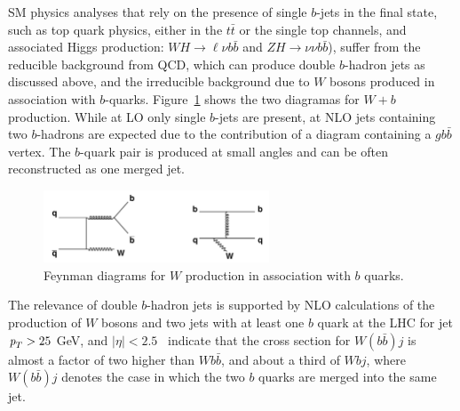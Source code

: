 SM physics analyses that rely on the presence of single $b$-jets in the final state, such as top quark physics, either in the $t\bar{t}$ or the single top channels, and associated Higgs production: $WH\rightarrow\ell\nu b\bar{b}$ and $ZH\rightarrow\nu\nu b\bar{b}$),  suffer from  %
the reducible background from QCD, which can produce double $b$-hadron jets as discussed above, and the irreducible background due to $W$ bosons produced in association with $b$-quarks.
Figure~\ref{fig:Wplusb} shows the two diagramas %
for $W+b$ production. %
While at LO only single $b$-jets are present, at NLO jets containing two $b$-hadrons are expected due to the contribution of a diagram containing a $gb\bar{b}$ vertex. The $b$-quark pair is produced at small angles and can be often reconstructed as one merged jet.
\begin{figure}[hp]
\centering
\includegraphics[width=0.6\textwidth]{FIGS/Wbb_diagram.jpg}
\caption{Feynman diagrams for $W$ production in association with $b$ quarks.}
\label{fig:Wplusb}
\end{figure}

The relevance of double $b$-hadron jets is supported by NLO calculations of the production of $W$ bosons and two jets with at least one $b$ quark at the LHC for jet ${\emph{p}_{T}} > 25$ GeV, and $|\eta| < 2.5$~\cite{Campbell:2006} indicate that the cross section for $W(b\bar{b})j$ is almost a factor of two higher than $Wb\bar{b}$, and about a third of $Wbj$, where  $W(b\bar{b})j$ denotes the case in which the two $b$ quarks are merged into the same jet. 

